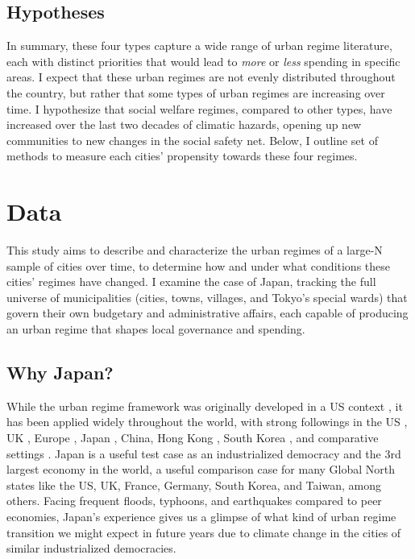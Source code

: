 \documentclass[preprint, 3p,
authoryear]{elsarticle} %
\begin{document}
\hypertarget{hypotheses}{%
\subsection{Hypotheses}\label{hypotheses}}

In summary, these four types capture a wide range of urban regime
literature, each with distinct priorities that would lead to \emph{more}
or \emph{less} spending in specific areas. I expect that these urban
regimes are not evenly distributed throughout the country, but rather
that some types of urban regimes are increasing over time. I hypothesize
that social welfare regimes, compared to other types, have increased
over the last two decades of climatic hazards, opening up new
communities to new changes in the social safety net. Below, I outline
set of methods to measure each cities' propensity towards these four
regimes.

\hypertarget{data}{%
\section{Data}\label{data}}

This study aims to describe and characterize the urban regimes of a
large-N sample of cities over time, to determine how and under what
conditions these cities' regimes have changed. I examine the case of
Japan, tracking the full universe of municipalities (cities, towns,
villages, and Tokyo's special wards) that govern their own budgetary and
administrative affairs, each capable of producing an urban regime that
shapes local governance and spending.

\hypertarget{why-japan}{%
\subsection{Why Japan?}\label{why-japan}}

While the urban regime framework was originally developed in a US
context \citep{stone_1989}, it has been applied widely throughout the
world, with strong followings in the US \citep{kilburn_2004}, UK
\citep{bassett_1996, davies_2017}, Europe
\citep{stoker_and_mossberger_1994, arbaci_2019}, Japan
\citep{hill_fujita_2000, saito_2003, sorensen_et_al_2010, tsukamoto_2012},
China, Hong Kong \citep{lai_and_chui_2014}, South Korea
\citep{shin_et_al_2015}, and comparative settings
\citep{mossberger_and_stoker_2001, ramirez_perez_et_al_2008}. Japan is a
useful test case as an industrialized democracy and the 3rd largest
economy in the world, a useful comparison case for many Global North
states like the US, UK, France, Germany, South Korea, and Taiwan, among
others. Facing frequent floods, typhoons, and earthquakes compared to
peer economies, Japan's experience gives us a glimpse of what kind of
urban regime transition we might expect in future years due to climate
change in the cities of similar industrialized democracies.
\end{document}
